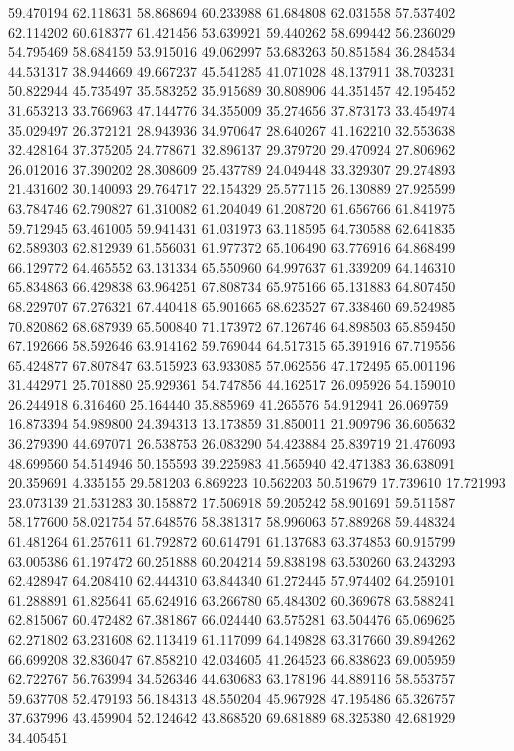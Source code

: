 59.470194
62.118631
58.868694
60.233988
61.684808
62.031558
57.537402
62.114202
60.618377
61.421456
53.639921
59.440262
58.699442
56.236029
54.795469
58.684159
53.915016
49.062997
53.683263
50.851584
36.284534
44.531317
38.944669
49.667237
45.541285
41.071028
48.137911
38.703231
50.822944
45.735497
35.583252
35.915689
30.808906
44.351457
42.195452
31.653213
33.766963
47.144776
34.355009
35.274656
37.873173
33.454974
35.029497
26.372121
28.943936
34.970647
28.640267
41.162210
32.553638
32.428164
37.375205
24.778671
32.896137
29.379720
29.470924
27.806962
26.012016
37.390202
28.308609
25.437789
24.049448
33.329307
29.274893
21.431602
30.140093
29.764717
22.154329
25.577115
26.130889
27.925599
63.784746
62.790827
61.310082
61.204049
61.208720
61.656766
61.841975
59.712945
63.461005
59.941431
61.031973
63.118595
64.730588
62.641835
62.589303
62.812939
61.556031
61.977372
65.106490
63.776916
64.868499
66.129772
64.465552
63.131334
65.550960
64.997637
61.339209
64.146310
65.834863
66.429838
63.964251
67.808734
65.975166
65.131883
64.807450
68.229707
67.276321
67.440418
65.901665
68.623527
67.338460
69.524985
70.820862
68.687939
65.500840
71.173972
67.126746
64.898503
65.859450
67.192666
58.592646
63.914162
59.769044
64.517315
65.391916
67.719556
65.424877
67.807847
63.515923
63.933085
57.062556
47.172495
65.001196
31.442971
25.701880
25.929361
54.747856
44.162517
26.095926
54.159010
26.244918
6.316460
25.164440
35.885969
41.265576
54.912941
26.069759
16.873394
54.989800
24.394313
13.173859
31.850011
21.909796
36.605632
36.279390
44.697071
26.538753
26.083290
54.423884
25.839719
21.476093
48.699560
54.514946
50.155593
39.225983
41.565940
42.471383
36.638091
20.359691
4.335155
29.581203
6.869223
10.562203
50.519679
17.739610
17.721993
23.073139
21.531283
30.158872
17.506918
59.205242
58.901691
59.511587
58.177600
58.021754
57.648576
58.381317
58.996063
57.889268
59.448324
61.481264
61.257611
61.792872
60.614791
61.137683
63.374853
60.915799
63.005386
61.197472
60.251888
60.204214
59.838198
63.530260
63.243293
62.428947
64.208410
62.444310
63.844340
61.272445
57.974402
64.259101
61.288891
61.825641
65.624916
63.266780
65.484302
60.369678
63.588241
62.815067
60.472482
67.381867
66.024440
63.575281
63.504476
65.069625
62.271802
63.231608
62.113419
61.117099
64.149828
63.317660
39.894262
66.699208
32.836047
67.858210
42.034605
41.264523
66.838623
69.005959
62.722767
56.763994
34.526346
44.630683
63.178196
44.889116
58.553757
59.637708
52.479193
56.184313
48.550204
45.967928
47.195486
65.326757
37.637996
43.459904
52.124642
43.868520
69.681889
68.325380
42.681929
34.405451
